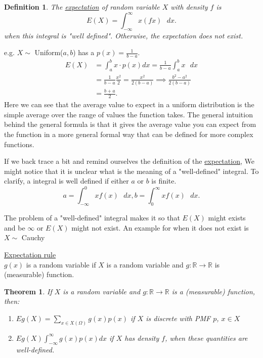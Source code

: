 \documentclass{article}
\newtheorem{theorem}{Theorem}
\newtheorem{definition}{Definition}
\newcommand{\R}{ \mathbb{R} }
\begin{document}
\begin{definition}
    The \underline{expectation} of random variable $X$ with density $f$ is 
   \[
       E(X) = \int_{-\infty}^{\infty} x(fx) \text{ } dx 
   .\] 
   when this integral is "well defined". Otherwise, the expectation does not exist.
\end{definition}
e.g. $X \sim $ Uniform($a, b$) has a $p(x) = \frac{1}{b-a}$. 
\begin{align*}
    E(X) &= \int_{a}^{b} x \cdot  p(x) dx = \frac{1}{b-a} \int_{a}^{b} x \text{ } dx \\
         &= \frac{1}{b-a} \frac{x^2}{2} = \frac{x^2}{2(b-a)} \implies \frac{b^2-a^2}{2(b-a)}  \\
         &= \frac{b+a}{2}
.\end{align*}
Here we can see that the average value to expect in a uniform distribution is the 
simple average over the range of values the function takes. The general intuition 
behind the general formula is that it gives the average value you can expect from the
function in a more general formal way that can be defined for more complex functions. 

If we back trace a bit and remind ourselves the definition of the \underline{expectation},
We might notice that it is unclear what is the meaning of a "well-defined" integral. 
To clarify, a integral is well defined if either $a$ or $b$ is finite. 
\[
    a = \int_{-\infty}^{0} xf(x) \text{ } dx, b =\int_{0}^{\infty} xf(x) \text{ } dx 
.\] 

The problem of a "well-defined" integral makes it so that $E(X)$ might exists and be 
$\infty$ or $E(X)$ might not exist. An example for when it does not exist is 
$X \sim $ Cauchy

\underline{Expectation rule} \\
$g(x)$ is a random variable if $X$ is a random variable and $g : \R \to \R$ is (measurable) function. 

\begin{theorem}
    If $X$ is a random variable and $g : \R \to  \R$ is a (measurable) function, then: 
\begin{enumerate}
    \item $Eg(X) = \sum_{x \in X(\Omega)} g(x)p(x)$ if $X$ is discrete with PMF $p$, $x \in  X$
    \item $Eg(X) \int_{-\infty}^{\infty} g(x)p(x) dx$ if $X$ has density $f$, when these quantities are well-defined.
\end{enumerate}
\end{theorem}
\end{document}
